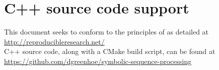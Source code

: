 
\chapter{C++ source code support}
\label{app:src_code}
This document seeks to conform to the principles of  as detailed at
\\\indentx\url{http://reproducibleresearch.net/}\\
C++ source code, along with a CMake build script, can be found at
\\\indentx\url{https://github.com/dgreenhoe/symbolic-sequence-processing}

